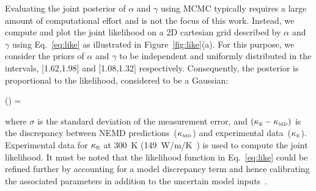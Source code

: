 Evaluating the joint posterior of $\alpha$ and $\gamma$ using MCMC typically requires a large amount of
computational effort and is not the focus of this work. Instead, we compute and plot the joint likelihood on
a 2D cartesian grid described by $\alpha$ and $\gamma$ using Eq.~\ref{eq:like} as illustrated in
Figure~\ref{fig:like}(a). For this purpose, we consider the priors of $\alpha$ and $\gamma$ to be
independent and uniformly distributed in the intervals, [1.62,1.98] and [1.08,1.32] respectively. 
Consequently, the posterior is proportional to the likelihood, considered to be a Gaussian:

\be
{}(\vert{}) = \exp{}
\label{eq:like}
\ee

\noindent where $\sigma$ is the standard deviation of the measurement error, and
$(\kappa_{\tiny{\mbox{E}}} - \kappa_{\tiny{\mbox{MD}}})$ is the discrepancy between 
NEMD predictions~($\kappa_{\tiny{\mbox{MD}}}$)
and experimental data~($\kappa_{\tiny{\mbox{E}}}$). Experimental data for $\kappa_{\tiny{\mbox{E}}}$ at 300~K
(149~W/m/K~\cite{Shanks:1963}) is used to compute the joint likelihood. It must be noted that the likelihood
function in Eq.~\ref{eq:like} could be refined further by accounting for a model discrepancy term and hence
calibrating the associated parameters in addition to the uncertain model inputs~\cite{Kennedy:2001,Ling:2014}. 

